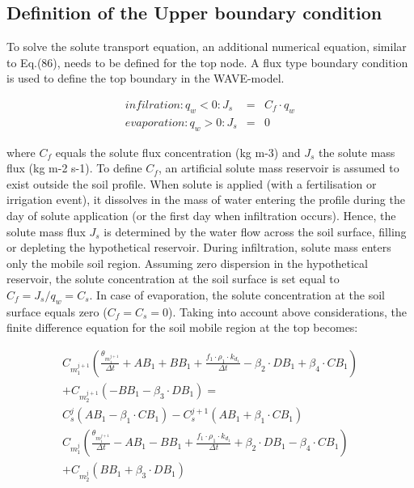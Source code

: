 \subsection{Definition of the Upper boundary condition}

To solve the solute transport equation, an additional numerical equation, similar to Eq.(86), needs to be defined for the top node. A flux type boundary condition is used to define the top boundary in the WAVE-model.

\begin{eqnarray}
infilration : q_w < 0  : J_s &=& C_f \cdot q_w \\
\nonumber
evaporation : q_w > 0 : J_s &=& 0
\end{eqnarray}

where $C_f$ equals the solute flux concentration (kg m-3) and $J_s$ the solute mass flux (kg m-2 s-1). To define $C_f$, an artificial solute mass reservoir is assumed to exist outside the soil profile. When solute is applied (with a fertilisation or irrigation event), it dissolves in the mass of water entering the profile during the day of solute application (or the first day when infiltration occurs). Hence, the solute mass flux $J_s$ is determined by the water flow across the soil surface, filling or depleting the hypothetical reservoir. During infiltration, solute mass enters only the mobile soil region. Assuming zero dispersion in the hypothetical reservoir, the solute concentration at the soil surface is set equal to $C_f = J_s/q_w = C_s$. In case of evaporation, the solute concentration at the soil surface equals zero ($C_f = C_s = 0$). Taking into account above considerations, the finite difference equation for the soil mobile region at the top becomes:

\begin{equation}
\begin{split}
C_m_1^{j+1}\left(\frac{\theta_m_1^{j+1}}{\Delta t} + AB_1 + BB_1 + \frac{f_1\cdot \rho_1 \cdot k_d_1}{\Delta t} - \beta_2\cdot DB_1 + \beta_4 \cdot CB_1 \right)\\
+ C_m_2^{j+1}(-BB_1 - \beta_3 \cdot DB_1) = \\
C_s^j(AB_1 - \beta_1 \cdot CB_1) - C_s^{j+1}(AB_1 + \beta_1 \cdot CB_1)\\
C_m_1^{j}\left(\frac{\theta_m_1^{j+1}}{\Delta t} - AB_1 - BB_1 + \frac{f_1\cdot \rho_1 \cdot k_d_1}{\Delta t} + \beta_2\cdot DB_1 - \beta_4 \cdot CB_1 \right)\\
+ C_m_2^{j}(BB_1 + \beta_3 \cdot DB_1)
\end{split}
\end{equation}

